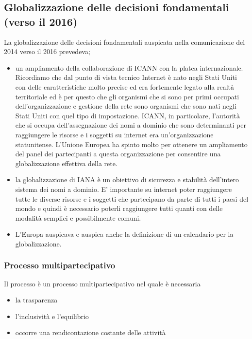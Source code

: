 \subsection{Globalizzazione delle decisioni fondamentali (verso il 2016)}

La globalizzazione delle decisioni fondamentali auspicata nella comunicazione del 2014 verso il 2016 prevedeva;

\begin{itemize}
    \item un ampliamento della collaborazione di ICANN con la platea internazionale. Ricordiamo che dal punto di vista tecnico Internet è nato negli Stati Uniti con delle caratteristiche molto precise ed era fortemente legato alla realtà territoriale ed è per questo che gli organismi che si sono per primi occupati dell'organizzazione e gestione della rete sono organismi che sono nati negli Stati Uniti con quel tipo di impostazione. ICANN, in particolare, l'autorità che si occupa dell'assegnazione dei nomi a dominio che sono determinanti per raggiungere le risorse e i soggetti su internet era un'organizzazione statunitense. L'Unione Europea ha spinto molto per ottenere un ampliamento del panel dei partecipanti a questa organizzazione per consentire una globalizzazione effettiva della rete.
    
    \item la globalizzazione di IANA è un obiettivo di sicurezza e stabilità dell'intero sistema dei nomi a dominio. E' importante su internet poter raggiungere tutte le diverse risorse e i soggetti che partecipano da parte di tutti i paesi del mondo e quindi è necessario poterli raggiungere tutti quanti con delle modalità semplici e possibilmente comuni.
    
    \item L'Europa auspicava e auspica anche la definizione di un calendario per la globalizzazione.
\end{itemize}

\subsubsection{Processo multipartecipativo}

Il processo è un processo multipartecipativo nel quale è necessaria

\begin{itemize}
    \item la trasparenza
    \item l'inclusività  e l'equilibrio
    \item occorre una rendicontazione costante delle attività
\end{itemize}

